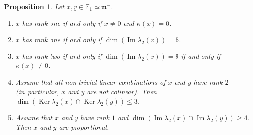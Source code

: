 \documentclass[10pt]{amsart}
\newenvironment{enumeratea}
{\bgroup\def\theenumi{\alph{enumi}}\begin{enumerate}}
{\end{enumerate}\egroup}
\theoremstyle{plain}
\newtheorem{prop}[theo]{Proposition}
\theoremstyle{definition}
\DeclareMathOperator{\im}{Im}\let\Im\im
\DeclareMathOperator{\Ker}{Ker}
\newcommand{\bE}{\mathbb{E}}
\newcommand{\fm}{\mathfrak{m}}
\renewcommand{\iff}{if and only if }
\begin{document}
\begin{prop}
\label{prop:fu-}
Let $x,y \in \bE_1 \simeq \fm^-$.
\begin{enumeratea}
\item\label{prop:fu-a} $x$ has rank one \iff $x \neq 0$ and $\kappa(x) = 0$.
\item\label{prop:fu-b} $x$ has rank one \iff $\dim \left (\im \lambda_2(x) \right) =5$.
\item\label{prop:fu-c} $x$ has rank two \iff $\dim \left (\im \lambda_2(x) \right) =9$ \iff $\kappa(x) \neq 0$.
\item\label{prop:fu-d} Assume that all non trivial linear combinations of $x$ and $y$ have rank $2$ (in~particular,
$x$ and $y$ are not colinear). Then
$\dim (\Ker \lambda_2(x) \cap \Ker \lambda_2(y)) \leq 3$.
\item\label{prop:fu-e} Assume that $x$ and $y$ have rank $1$ and $\dim (\im \lambda_2(x) \cap \im \lambda_2(y)) \geq 4$.
Then $x$ and $y$ are proportional.
\end{enumeratea}
\end{prop}
\end{document}
